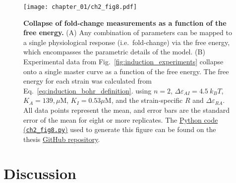 \documentclass[12pt]{caltech_thesis}
\begin{document}
\hypertarget{fig:induction_collapse}{%
\begin{figure}
\centering
\texttt{[image: chapter\_01/ch2\_fig8.pdf]}
\caption[{Collapse of fold-change measurements as a function of the free
energy.}]{\textbf{Collapse of fold-change measurements as a function of
the free energy.} (A) Any combination of parameters can be mapped to a
single physiological response (i.e.~fold-change) via the free energy,
which encompasses the parametric details of the model. (B) Experimental
data from Fig.~\ref{fig:induction_experiments} collapse onto a single
master curve as a function of the free energy. The free energy for each
strain was calculated from Eq.~\ref{eq:induction_bohr_definition}. using
\(n=2\), \(\Delta\varepsilon_{AI}=4.5~k_BT\), \(K_A=139, \mu\text{M}\),
\(K_I=0.53 \mu\text{M}\), and the strain-specific \(R\) and
\(\Delta\varepsilon_{RA}\). All data points represent the mean, and
error bars are the standard error of the mean for eight or more
replicates. The
\href{https://github.com/gchure/phd/blob/master/src/chapter_02/code/ch2_fig8.py}{Python
code (\texttt{ch2\_fig8.py})} used to generate this figure can be found
on the thesis \href{https://github.com/gchure/phd}{GitHub repository}.}
\label{fig:induction_collapse}
\end{figure}
}

\hypertarget{discussion}{%
\section{Discussion}\label{discussion}}
\end{document}
